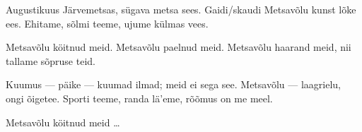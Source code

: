Augustikuus J\"arvemetsas,
s\"ugava metsa sees.
Gaidi/skaudi Metsav\~olu
kunst l\~oke ees.
Ehitame, s\~olmi teeme,
ujume k\"ulmas vees.

Metsav\~olu k\"oitnud meid.
Metsav\~olu paelnud meid.
Metsav\~olu haarand meid,
nii tallame s\~opruse teid.

Kuumus --- p\"aike --- kuumad ilmad;
meid ei sega see.
Metsav\~olu --- laagrielu,
ongi \~oigetee.
Sporti teeme, randa l\"a'eme,
r\~o\~omus on me meel.

Metsav\~olu k\"oitnud meid \ldots